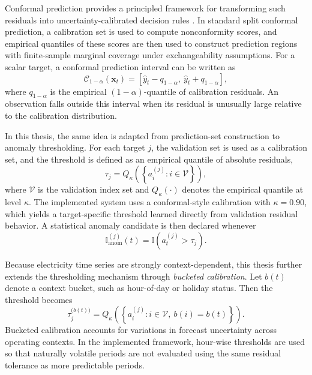 Conformal prediction provides a principled framework for transforming such residuals into uncertainty-calibrated decision rules \cite{shafer2008tutorial}. In standard split conformal prediction, a calibration set is used to compute nonconformity scores, and empirical quantiles of these scores are then used to construct prediction regions with finite-sample marginal coverage under exchangeability assumptions. For a scalar target, a conformal prediction interval can be written as
\begin{equation}
\mathcal{C}_{1-\alpha}(\mathbf{x}_t) = \left[\hat{y}_t - q_{1-\alpha},\ \hat{y}_t + q_{1-\alpha}\right],
\label{eq:conformal_interval}
\end{equation}
where $q_{1-\alpha}$ is the empirical $(1-\alpha)$-quantile of calibration residuals. An observation falls outside this interval when its residual is unusually large relative to the calibration distribution.

In this thesis, the same idea is adapted from prediction-set construction to anomaly thresholding. For each target $j$, the validation set is used as a calibration set, and the threshold is defined as an empirical quantile of absolute residuals,
\begin{equation}
\tau_j = Q_{\kappa}\!\left(\left\{ a_i^{(j)} : i \in \mathcal{V} \right\}\right),
\label{eq:global_threshold}
\end{equation}
where $\mathcal{V}$ is the validation index set and $Q_{\kappa}(\cdot)$ denotes the empirical quantile at level $\kappa$. The implemented system uses a conformal-style calibration with $\kappa = 0.90$, which yields a target-specific threshold learned directly from validation residual behavior. A statistical anomaly candidate is then declared whenever
\begin{equation}
\mathbb{I}_{\mathrm{anom}}^{(j)}(t) = \mathbb{I}\!\left(a_t^{(j)} > \tau_j\right).
\label{eq:basic_flag}
\end{equation}

Because electricity time series are strongly context-dependent, this thesis further extends the thresholding mechanism through \emph{bucketed calibration}. Let $b(t)$ denote a context bucket, such as hour-of-day or holiday status. Then the threshold becomes
\begin{equation}
\tau_j^{\bigl(b(t)\bigr)} = Q_{\kappa}\!\left(\left\{ a_i^{(j)} : i \in \mathcal{V},\ b(i)=b(t) \right\}\right).
\label{eq:bucket_threshold}
\end{equation}
Bucketed calibration accounts for variations in forecast uncertainty across
operating contexts. In the implemented framework, hour-wise thresholds are used
so that naturally volatile periods are not evaluated using the same residual
tolerance as more predictable periods.



